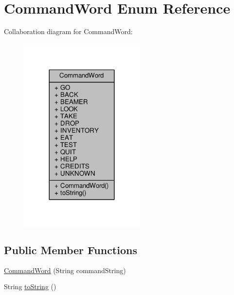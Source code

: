 \hypertarget{enumCommandWord}{\section{Command\-Word Enum Reference}
\label{enumCommandWord}
}


Collaboration diagram for Command\-Word\-:
\nopagebreak
\begin{figure}[H]
\begin{center}
\leavevmode
\includegraphics[width=180pt]{enumCommandWord__coll__graph}
\end{center}
\end{figure}
\subsection*{Public Member Functions}
\begin{DoxyCompactItemize}
\item 
\hyperlink{enumCommandWord_a7542ac054c8ee2abf183e01d4e5d2d1f}{Command\-Word} (String command\-String)
\item 
String \hyperlink{enumCommandWord_a923828e4531df99a4654d35d160ec486}{to\-String} ()
\end{DoxyCompactItemize}
